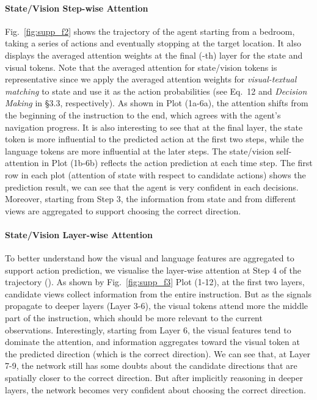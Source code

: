\documentclass[final]{cvpr}
\begin{document}
\paragraph{State/Vision Step-wise Attention}
Fig.~\ref{fig:supp_f2} shows the trajectory of the agent starting from a bedroom, taking a series of actions and eventually stopping at the target location. It also displays the averaged attention weights at the final (-th) layer for the state and visual tokens. Note that the averaged attention for state/vision tokens is representative since we apply the averaged attention weights for \textit{visual-textual matching} to state and use it as the action probabilities (see Eq.~12 and \textit{Decision Making} in \S 3.3, respectively). As shown in Plot (1a-6a), the attention shifts from the beginning of the instruction to the end, which agrees with the agent's navigation progress. It is also interesting to see that at the final layer, the state token is more influential to the predicted action at the first two steps, while the language tokens are more influential at the later steps. The state/vision self-attention in Plot (1b-6b) reflects the action prediction at each time step. The first row in each plot (attention of state with respect to candidate actions) shows the prediction result, we can see that the agent is very confident in each decisions. Moreover, starting from Step 3, the information from state and from different views are aggregated to support choosing the correct direction.

\paragraph{State/Vision Layer-wise Attention}
To better understand how the visual and language features are aggregated to support action prediction, we visualise the layer-wise attention at Step 4 of the trajectory (). As shown by Fig.~\ref{fig:supp_f3} Plot (1-12), at the first two layers, candidate views collect information from the entire instruction. But as the signals propagate to deeper layers (Layer 3-6), the visual tokens attend more the middle part of the instruction, which should be more relevant to the current observations. Interestingly, starting from Layer 6, the visual features tend to dominate the attention, and information aggregates toward the visual token at the predicted direction (which is the correct direction). We can see that, at Layer 7-9, the network still has some doubts about the candidate directions that are spatially closer to the correct direction. But after implicitly reasoning in deeper layers, the network becomes very confident about choosing the correct direction.
\end{document}

